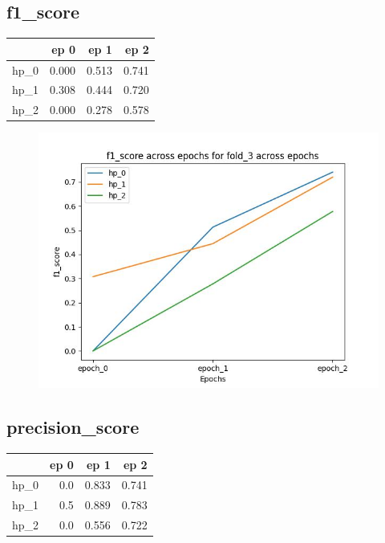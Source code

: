 \documentclass{article}
\begin{document}
\subsection{f1\_score}
\begin{tabular}{lrrr}
\toprule
{} &   ep 0 &   ep 1 &   ep 2 \\
\midrule
hp\_0 &  0.000 &  0.513 &  0.741 \\
hp\_1 &  0.308 &  0.444 &  0.720 \\
hp\_2 &  0.000 &  0.278 &  0.578 \\
\bottomrule
\end{tabular}

\begin{figure}[H]
\includegraphics[scale = 0.75]{fold_3/f1_score}
\end{figure}
\subsection{precision\_score}
\begin{tabular}{lrrr}
\toprule
{} &  ep 0 &   ep 1 &   ep 2 \\
\midrule
hp\_0 &   0.0 &  0.833 &  0.741 \\
hp\_1 &   0.5 &  0.889 &  0.783 \\
hp\_2 &   0.0 &  0.556 &  0.722 \\
\bottomrule
\end{tabular}
\end{document}
